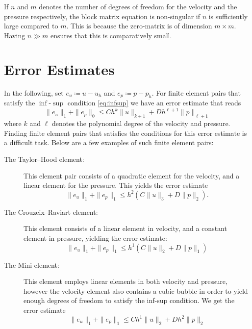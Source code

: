 If \( n \) and \( m \) denotes the number of degrees of freedom for the
velocity and the pressure respectively, the block matrix equation is
non-singular if \( n \) is sufficiently large compared to \( m \). This is
because the zero-matrix is of dimension \( m \times m \). Having \( n \gg m\)
ensures that this is comparatively small. 

\section{Error Estimates}

In the following, set \( e_u \coloneqq u - u_h \) and \( e_p \coloneqq p - p_h
\).  For finite element pairs that satisfy the \( \inf \)-\(\sup\) condition
\cref{eq:infsup} we have an error estimate that reads
\begin{equation}
    \| e_u \|_1 + \| e_p \|_0 \leq C h^k \|u\|_{k+1} + D h^{\ell + 1} \|p\|_{\ell + 1}
\end{equation}
where \( k \) and \( \ell \) denotes the polynomial degree of the velocity and
pressure. Finding finite element pairs that satisfies the conditions for this
error estimate is a difficult task. Below are a few examples of such finite
element pairs:
\begin{description}
    \item[The Taylor--Hood element:]
        This element pair consists of a quadratic element for the velocity, and
        a linear element for the pressure. This yields the error estimate
        \begin{equation}
            \| e_u \|_1 + \| e_p \|_1 \leq h^2 \left( C\|u\|_{3} + D \|p\|_{2}\right).
        \end{equation}
    \item[The Crouzeix--Raviart element:]
        This element consists of a linear element in velocity, and a constant
        element in pressure, yielding the error estimate:
        \begin{equation}
            \| e_u \|_1 + \| e_p \|_1 \leq h^1 \left(C \|u\|_{2} + D \|p\|_{1}\right)
        \end{equation}
    \item[The Mini element:]
        This element employs linear elements in both velocity and pressure,
        however the velocity element also contains a cubic bubble in order to
        yield enough degrees of freedom to satisfy the inf-sup condition. We get the error estimate
        \begin{equation}
            \| e_u \|_1 + \| e_p \|_1 \leq C h^1 \|u\|_{2} + D h^{2} \|p\|_{2}
        \end{equation}
\end{description}

